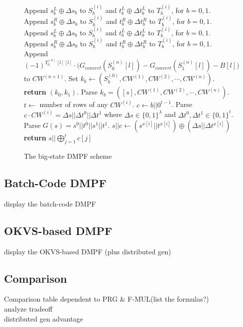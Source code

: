 \documentclass[sigconf]{acmart}
\begin{document}
\begin{figure}
{{\begin{algorithmic}
  \State Append $s_b^L\oplus \Delta s_b$ to $S_b^{(i)}$ and $t_b^L\oplus \Delta t_b^L$ to $T_b^{(i)}$, for $b = 0,1$.
  \State Append $s_b^R\oplus \Delta s_b$ to $S_b^{(i)}$ and $t_b^R\oplus \Delta t_b^R$ to $T_b^{(i)}$, for $b = 0,1$.
  \Else
  \State Append $s_b^L\oplus \Delta s_b$ to $S_b^{(i)}$ and $t_b^L\oplus \Delta t_b^L$ to $T_b^{(i)}$, for $b = 0,1$.
  \State Append $s_b^R\oplus \Delta s_b$ to $S_b^{(i)}$ and $t_b^R\oplus \Delta t_b^R$ to $T_b^{(i)}$, for $b = 0,1$.
  \EndIf
  \EndFor
  \EndFor
  \State Append $(-1)^{T_0^{(n)}[l][l]}\cdot\big(G_{convert}(S_0^{(n)}[l])-G_{convert}(S_1^{(n)}[l])-B[l]\big)$ to $CW^{(n+1)}$. 
  \EndFor
  \State Set $k_b \gets (S_b^{(0)}, CW^{(1)},CW^{(2)},\cdots,CW^{(n)})$.
  \State \textbf{return} $(k_0,k_1)$.
  \EndProcedure
  \State Parse $k_b = ([s],CW^{(1)},CW^{(2)},\cdots,CW^{(n)})$. 
  \State $t\leftarrow$ number of rows of any $CW^{(i)}$.
  \State $c\gets b||0^{t-1}$.
  \State Parse $c\cdot CW^{(i)} = \Delta s||\Delta t^0||\Delta t^1$ where $\Delta s\in\{0,1\}^\lambda$ and $\Delta t^0,\Delta t^1\in \{0,1\}^t$. 
  \State Parse $G(s) = s^0||t^0||s^1||t^1$. 
  \State $s||c\gets (s^{x[i]}||t^{x[i]})\oplus (\Delta s||\Delta t^{x[i]})$
  \EndFor
  \State \textbf{return} $s||\bigoplus_{j = 1}^t c[j]$
  \EndProcedure
  \end{algorithmic}
  }}
  \caption{The big-state DMPF scheme}
\end{figure}
\fi

\subsection{Batch-Code DMPF}
display the batch-code DMPF 

\subsection{OKVS-based DMPF}
display the OKVS-based DMPF (plus distributed gen)

\subsection{Comparison}
Comparison table dependent to PRG \& F-MUL(list the formulas?)\\
analyze tradeoff\\
distributed gen advantage
\end{document}
